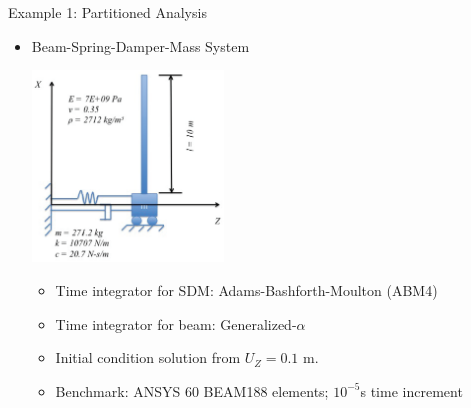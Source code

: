 \documentclass[xcolor=cmyk]{beamer}
\begin{document}
\begin{frame}{Example 1: Partitioned Analysis}

   \begin{itemize}
    \item 
    Beam-Spring-Damper-Mass System
    \begin{center}
    \includegraphics[width=2.0in]{EPSF/CoupledSystem.eps}
    \end{center}
    \begin{itemize}
        \item
        Time integrator for SDM: Adams-Bashforth-Moulton (ABM4)
        \item
        Time integrator for beam: Generalized-$\alpha$
        \item
        Initial condition solution from  $U_Z = 0.1$ m.
        \item
        Benchmark: ANSYS 60 BEAM188 elements; $10^{-5}$s time increment
    \end{itemize}
    \end{itemize}
    

\end{frame}
\end{document}
